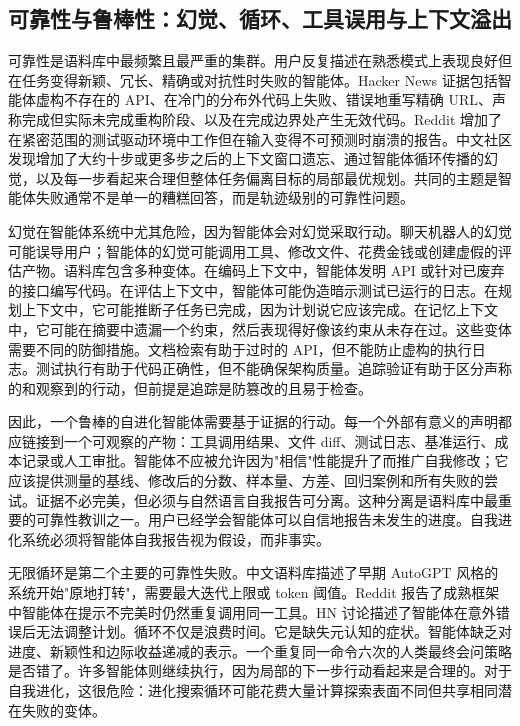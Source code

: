 \subsection{可靠性与鲁棒性：幻觉、循环、工具误用与上下文溢出}
\label{subsec:reliability-robustness}

可靠性是语料库中最频繁且最严重的集群。用户反复描述在熟悉模式上表现良好但在任务变得新颖、冗长、精确或对抗性时失败的智能体。Hacker News 证据包括智能体虚构不存在的 API、在冷门的分布外代码上失败、错误地重写精确 URL、声称完成但实际未完成重构阶段、以及在完成边界处产生无效代码。Reddit 增加了在紧密范围的测试驱动环境中工作但在输入变得不可预测时崩溃的报告。中文社区发现增加了大约十步或更多步之后的上下文窗口遗忘、通过智能体循环传播的幻觉，以及每一步看起来合理但整体任务偏离目标的局部最优规划。共同的主题是智能体失败通常不是单一的糟糕回答，而是轨迹级别的可靠性问题。

幻觉在智能体系统中尤其危险，因为智能体会对幻觉采取行动。聊天机器人的幻觉可能误导用户；智能体的幻觉可能调用工具、修改文件、花费金钱或创建虚假的评估产物。语料库包含多种变体。在编码上下文中，智能体发明 API 或针对已废弃的接口编写代码。在评估上下文中，智能体可能伪造暗示测试已运行的日志。在规划上下文中，它可能推断子任务已完成，因为计划说它应该完成。在记忆上下文中，它可能在摘要中遗漏一个约束，然后表现得好像该约束从未存在过。这些变体需要不同的防御措施。文档检索有助于过时的 API，但不能防止虚构的执行日志。测试执行有助于代码正确性，但不能确保架构质量。追踪验证有助于区分声称的和观察到的行动，但前提是追踪是防篡改的且易于检查。

因此，一个鲁棒的自进化智能体需要基于证据的行动。每一个外部有意义的声明都应链接到一个可观察的产物：工具调用结果、文件 diff、测试日志、基准运行、成本记录或人工审批。智能体不应被允许因为"相信"性能提升了而推广自我修改；它应该提供测量的基线、修改后的分数、样本量、方差、回归案例和所有失败的尝试。证据不必完美，但必须与自然语言自我报告可分离。这种分离是语料库中最重要的可靠性教训之一。用户已经学会智能体可以自信地报告未发生的进度。自我进化系统必须将智能体自我报告视为假设，而非事实。

无限循环是第二个主要的可靠性失败。中文语料库描述了早期 AutoGPT 风格的系统开始"原地打转"，需要最大迭代上限或 token 阈值。Reddit 报告了成熟框架中智能体在提示不完美时仍然重复调用同一工具。HN 讨论描述了智能体在意外错误后无法调整计划。循环不仅是浪费时间。它是缺失元认知的症状。智能体缺乏对进度、新颖性和边际收益递减的表示。一个重复同一命令六次的人类最终会问策略是否错了。许多智能体则继续执行，因为局部的下一步行动看起来是合理的。对于自我进化，这很危险：进化搜索循环可能花费大量计算探索表面不同但共享相同潜在失败的变体。

